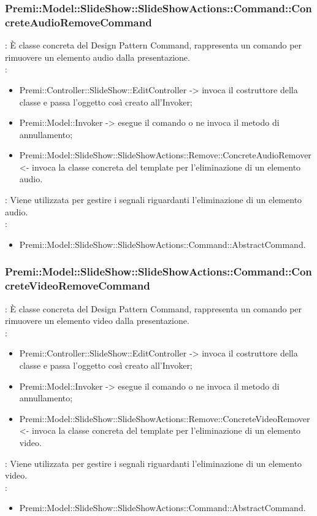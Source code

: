 {                    \subsubsection{Premi::Model::SlideShow::SlideShowActions::Command::ConcreteAudioRemoveCommand}{
				\textbf{\tipo}: È classe concreta del Design Pattern Command, rappresenta un comando per rimuovere un elemento audio dalla presentazione.\\	
				\textbf{\relaz}: 
				\begin{itemize}
					\item Premi::Controller::SlideShow::EditController -> invoca il costruttore della classe e passa l’oggetto così creato all’Invoker;
                    \item Premi::Model::Invoker -> esegue il comando o ne invoca il metodo di annullamento;
                    \item Premi::Model::SlideShow::SlideShowActions::Remove::ConcreteAudioRemover <- invoca la classe concreta del  template per l’eliminazione di un elemento audio.
				\end{itemize}	
                \textbf{\interfacce}: Viene utilizzata per gestire i segnali riguardanti l’eliminazione di un elemento audio.\\
                \textbf{\base}: 
                    \begin{itemize}
                    \item Premi::Model::SlideShow::SlideShowActions::Command::AbstractCommand.
                    \end{itemize}
                    }
                    \subsubsection{Premi::Model::SlideShow::SlideShowActions::Command::ConcreteVideoRemoveCommand}{
				\textbf{\tipo}: È classe concreta del Design Pattern Command, rappresenta un comando per rimuovere un elemento video dalla presentazione.\\	
				\textbf{\relaz}: 
				\begin{itemize}
					\item Premi::Controller::SlideShow::EditController -> invoca il costruttore della classe e passa l’oggetto così creato all’Invoker;
                    \item Premi::Model::Invoker -> esegue il comando o ne invoca il metodo di annullamento;
                    \item Premi::Model::SlideShow::SlideShowActions::Remove::ConcreteVideoRemover <- invoca la classe concreta del  template per l’eliminazione di un elemento video.
				\end{itemize}	
                \textbf{\interfacce}: Viene utilizzata per gestire i segnali riguardanti l’eliminazione di un elemento video.\\
                \textbf{\base}: 
                    \begin{itemize}
                    \item Premi::Model::SlideShow::SlideShowActions::Command::AbstractCommand.
                    \end{itemize}
                    }
}
